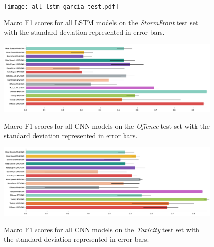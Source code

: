 \begin{figure}
\begin{minipage}{\textwidth}
\centering
  \texttt{[image: all\_lstm\_garcia\_test.pdf]}
  \caption{Macro F1 scores for all LSTM models on the \textit{StormFront} test set with the standard deviation represented in error bars.}
  \label{fig:garcia_lstm_test}
  \vfill
    \includegraphics[width=\textwidth]{all_cnn_davidson_test.pdf}
    \caption{Macro F1 scores for all CNN models on the \textit{Offence} test set with the standard deviation represented in error bars.}
    \label{fig:davidson_cnn_test}
    \vfill
    \includegraphics[width=\textwidth]{all_cnn_wulczyn_test.pdf}
    \caption{Macro F1 scores for all CNN models on the \textit{Toxicity} test set with the standard deviation represented in error bars.}
    \label{fig:wulczyn_cnn_test}
  \end{minipage}
\end{figure}

